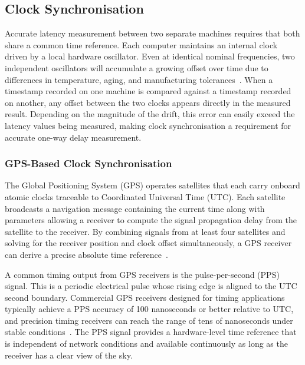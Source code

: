  

\subsection{Clock Synchronisation}\label{subsec:clock-sync}

Accurate latency measurement between two separate machines requires that both share a common time reference. Each computer maintains an internal clock driven by a local hardware oscillator. Even at identical nominal frequencies, two independent oscillators will accumulate a growing offset over time due to differences in temperature, aging, and manufacturing tolerances~\cite{vannicola2012}. When a timestamp recorded on one machine is compared against a timestamp recorded on another, any offset between the two clocks appears directly in the measured result. Depending on the magnitude of the drift, this error can easily exceed the latency values being measured, making clock synchronisation a requirement for accurate one-way delay measurement.

\subsubsection{GPS-Based Clock Synchronisation}\label{subsubsec:gps-sync}

The Global Positioning System (GPS) operates satellites that each carry onboard atomic clocks traceable to Coordinated Universal Time (UTC). Each satellite broadcasts a navigation message containing the current time along with parameters allowing a receiver to compute the signal propagation delay from the satellite to the receiver. By combining signals from at least four satellites and solving for the receiver position and clock offset simultaneously, a GPS receiver can derive a precise absolute time reference~\cite{misra2011}.

A common timing output from GPS receivers is the pulse-per-second (PPS) signal. This is a periodic electrical pulse whose rising edge is aligned to the UTC second boundary. Commercial GPS receivers designed for timing applications typically achieve a PPS accuracy of 100 nanoseconds or better relative to UTC, and precision timing receivers can reach the range of tens of nanoseconds under stable conditions~\cite{vannicola2012, sesia2010}. The PPS signal provides a hardware-level time reference that is independent of network conditions and available continuously as long as the receiver has a clear view of the sky.


